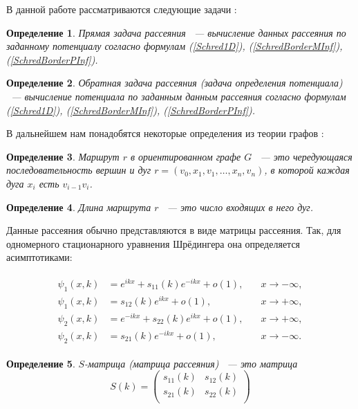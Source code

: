 \documentclass[a4 paper, 12 pt]{extarticle}
\newtheorem{Def}{Определение}[section]
\begin{document}
   В данной работе рассматриваются следующие задачи \cite{Soliton}: 

   \begin{Def}
   	Прямая задача рассеяния ~--- вычисление данных рассеяния по заданному потенциалу согласно формулам (\ref{Schred1D}), (\ref{SchredBorderMInf}), (\ref{SchredBorderPInf}).
   \end{Def}

   \begin{Def}
   	Обратная задача рассеяния (задача определения потенциала) ~--- вычисление потенциала по заданным данным рассеяния согласно формулам (\ref{Schred1D}), (\ref{SchredBorderMInf}), (\ref{SchredBorderPInf}).
   \end{Def}

    В дальнейшем нам понадобятся некоторые определения из теории графов \cite{Emelichev}:

   \begin{Def}
   Маршрут $r$ в ориентированном графе $G$ ~--- это чередующаяся последовательность вершин и дуг $r = \left(v_0, x_1, v_1, \ldots, x_n, v_n\right)$, в которой каждая дуга $x_i$ есть $v_{i-1} v_i$.
   \end{Def}
   
   \begin{Def}
   	Длина маршрута $r$ ~--- это число входящих в него дуг.
   \end{Def}

   Данные рассеяния обычно представляются в виде матрицы рассеяния. Так, для одномерного стационарного уравнения Шрёдингера она определяется асимптотиками:
   
   \begin{gather*}
   \begin{aligned}
   \psi_1(x,k)&=e^{ikx}+s_{11}(k)e^{-ikx}+o(1), \quad &x\rightarrow-\infty,\\
   \psi_1(x,k)&=s_{12}(k)e^{ikx}+o(1), \quad &x\rightarrow+\infty,\\
   \psi_2(x,k)&=e^{-ikx}+s_{22}(k)e^{ikx}+o(1), \quad &x\rightarrow+\infty,\\
   \psi_2(x,k)&=s_{21}(k)e^{-ikx}+o(1), \quad &x\rightarrow-\infty.
   \end{aligned}
   \end{gather*}
   

   \begin{Def}
   	$S$-матрица (матрица рассеяния) ~--- это матрица 
    \begin{equation}\label{DSM}
    S(k)=\left(%
    \begin{array}{cc}
    s_{11}(k) & s_{12}(k) \\
    s_{21}(k) & s_{22}(k) \\
    \end{array}%
    \right)
    \end{equation}
   \end{Def}
\end{document}
